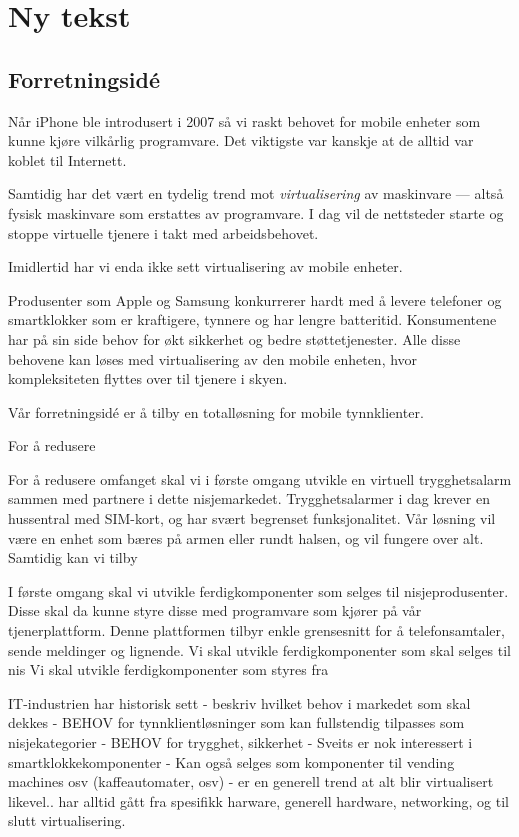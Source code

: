 \chapter{Ny tekst}

\section{Forretningsidé}

Når iPhone ble introdusert i 2007 så vi raskt behovet for mobile enheter som
kunne kjøre vilkårlig programvare. Det viktigste var kanskje at de alltid var
koblet til Internett.

Samtidig har det vært en tydelig trend mot \textit{virtualisering} av
maskinvare --- altså fysisk maskinvare som erstattes av programvare.  I dag vil
de nettsteder starte og stoppe virtuelle tjenere i takt med arbeidsbehovet.

Imidlertid har vi enda ikke sett virtualisering av mobile enheter.

Produsenter som Apple og Samsung konkurrerer hardt med å levere telefoner og
smartklokker som er kraftigere, tynnere og har lengre batteritid.
%
Konsumentene har på sin side behov for økt sikkerhet og bedre støttetjenester.
%
Alle disse behovene kan løses med virtualisering av den mobile enheten, hvor
kompleksiteten flyttes over til tjenere i skyen.

Vår forretningsidé er å tilby en totalløsning for mobile tynnklienter.

For å redusere

For å redusere omfanget skal vi i første omgang utvikle en virtuell
trygghetsalarm sammen med partnere i dette nisjemarkedet. Trygghetsalarmer i
dag krever en hussentral med SIM-kort, og har svært begrenset funksjonalitet.
Vår løsning vil være en enhet som bæres på armen eller rundt halsen, og vil
fungere over alt. Samtidig kan vi tilby 

I første omgang skal vi utvikle ferdigkomponenter som selges til
nisjeprodusenter. Disse skal da kunne styre disse med programvare som kjører på
vår tjenerplattform. Denne plattformen tilbyr enkle grensesnitt for å 
telefonsamtaler, sende meldinger og lignende.
Vi skal utvikle ferdigkomponenter som skal selges til nis
Vi skal utvikle ferdigkomponenter som styres fra 


IT-industrien har historisk sett
- beskriv hvilket behov i markedet som skal dekkes
  - BEHOV for tynnklientløsninger som kan fullstendig tilpasses som
  nisjekategorier
  - BEHOV for trygghet, sikkerhet
    - Sveits er nok interessert i smartklokkekomponenter
    - Kan også selges som komponenter til vending machines osv (kaffeautomater,
        osv)
    - er en generell trend at alt blir virtualisert likevel.. har alltid gått
    fra spesifikk harware, generell hardware, networking, og til slutt
    virtualisering.

